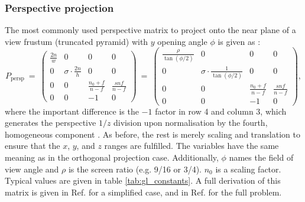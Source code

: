\subsubsection{Perspective projection}
The most commonly used perspective matrix to project onto the near plane of a view frustum (truncated pyramid)
with $y$ opening angle $\phi$ is given as \cite{web_gl_perspective} \cite{web_gl_frustum} \cite[p. 81]{Sellers2002}:
\begin{equation}
	P_{\mathrm{persp}} \ =\
		\left( \begin{array}{cccc}
			\frac{2n}{w} &                          0 &                  0 &  0                 \\
			           0 &  \sigma \cdot \frac{2n}{h} &                  0 &  0                 \\
			           0 &                          0 &  \frac{n_0+f}{n-f} &  \frac{s n f}{n-f} \\
			           0 &                          0 &         \boxed{-1} &  0
		\end{array} \right) \ = \
		\left( \begin{array}{cccc}
			\frac{\rho}{\tan\left(\phi/2 \right)} &                                                0 &                  0 &  0                 \\
			                                    0 &  \sigma \cdot \frac{1}{\tan\left(\phi/2 \right)} &                  0 &  0                 \\
			                                    0 &                                                0 &  \frac{n_0+f}{n-f} &  \frac{s n f}{n-f} \\
			                                    0 &                                                0 &         \boxed{-1} &  0
		\end{array} \right),
\end{equation}
where the important difference is the $-1$ factor in row 4 and column 3, which generates the perspective
$1/z$ division upon normalisation by the fourth, homogeneous component \cite[pp. 350-351]{Kuipers2002}.
As before, the rest is merely scaling and translation to ensure that the $x$, $y$, and $z$ ranges
are fulfilled.
The variables have the same meaning as in the orthogonal projection case.
Additionally, $\phi$ names the field of view angle and $\rho$ is the screen ratio (e.g. 9/16 or 3/4).
$n_0$ is a scaling factor. Typical values are given in table \ref{tab:gl_constants}.
A full derivation of this matrix is given in Ref. \cite[pp. 350-351]{Kuipers2002}
for a simplified case, and in Ref. \cite{web_webgl_perspective} for the full
problem.


